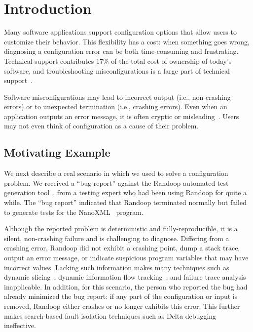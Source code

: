 
\section{Introduction}
\label{sec:introduction}

Many software applications support
configuration options that allow users to
customize their behavior. This flexibility has a cost: when something
goes wrong, diagnosing a configuration error can be both time-consuming
and frustrating. Technical support contributes 17\% of the total cost of ownership of
today's software, and troubleshooting misconfigurations
is a large part of technical support~\cite{confevidence}.

Software misconfigurations may lead to incorrect output (i.e., non-crashing
errors) or to unexpected termination
(i.e., crashing errors).  Even when an application outputs an error
message, it is often cryptic or misleading~\cite{Yin:2011:ESC, Attariyan:2010:ACT, Hubaux:2012, rangefix}.
Users may not even think of configuration as a cause of their problem.

\subsection{Motivating Example}
\label{sec:mot}

We next describe a real scenario in which we used \ourtool to solve a configuration problem. 
We received a ``bug report'' against the Randoop
automated test generation tool~\cite{PachecoLET2007},
from a testing expert who had been using Randoop for quite a while.
The ``bug report'' indicated that Randoop terminated normally but
failed to generate tests for the NanoXML~\cite{nanoxml} program. 

Although the reported problem is deterministic and fully-reproducible,
it is a silent, non-crashing failure and is
challenging to diagnose. Differing from
a crashing error, Randoop did not exhibit a crashing point, dump
 a stack trace, output an error message, or indicate suspicious program
variables that may have incorrect values. Lacking such information
makes many
techniques such as dynamic slicing~\cite{Zhang:2003:PDS},
dynamic information flow tracking~\cite{Attariyan:2010:ACT}, and
failure trace analysis~\cite{Rabkin:2011:PPC} inapplicable.
In addition, for this scenario, the person who reported the bug had already
minimized the bug report:  if any part of the 
configuration or input is removed, Randoop either crashes or
no longer exhibits this error.
This further makes 
search-based fault isolation techniques such as Delta debugging~\cite{Zeller:2002:ICC}
ineffective.


